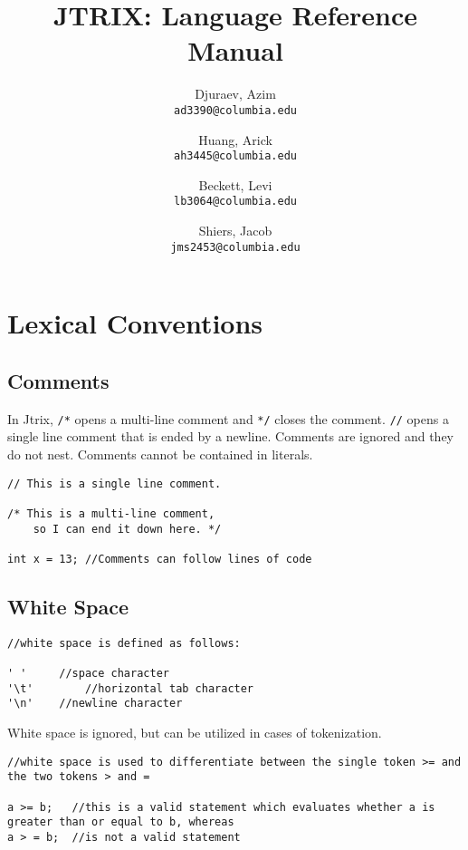 \documentclass[titlepage, 12pt]{report}
\begin{document}
\author{
  Djuraev, Azim\\
  \texttt{ad3390@columbia.edu}
  \and
  Huang, Arick\\
  \texttt{ah3445@columbia.edu}
  \and
  Beckett, Levi\\
  \texttt{lb3064@columbia.edu}
  \and
  Shiers, Jacob\\
  \texttt{jms2453@columbia.edu}
}

\title{JTRIX: Language Reference Manual}
\date{}
\maketitle


\tableofcontents

\chapter{Lexical Conventions}

\section{Comments}
In Jtrix, \texttt{/*} opens a multi-line comment and \texttt{*/} closes the comment. \texttt{//} opens a single line comment that is ended by a newline. Comments are ignored and they do not nest. Comments cannot be contained in literals.

\begin{lstlisting}
// This is a single line comment.

/* This is a multi-line comment,
	so I can end it down here. */

int x = 13; //Comments can follow lines of code
\end{lstlisting}

\section{White Space}
\begin{lstlisting}
//white space is defined as follows:

' '	    //space character
'\t'		//horizontal tab character
'\n'	//newline character
\end{lstlisting}
White space is ignored, but can be utilized in cases of tokenization.
\begin{lstlisting}
//white space is used to differentiate between the single token >= and the two tokens > and =

a >= b;   //this is a valid statement which evaluates whether a is greater than or equal to b, whereas
a > = b;  //is not a valid statement
\end{lstlisting}
\end{document}
